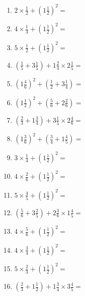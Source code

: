 \documentclass[12pt]{article}
\begin{document}
\begin{enumerate}
\item \large $ 2 \times \frac{1}{2} + (1 \frac{1}{2})^2 = $ \vspace{1.8cm}
\item \large $ 4 \times \frac{1}{3} + (1 \frac{1}{2})^2 = $ \vspace{1.8cm}
\item \large $ 5 \times \frac{1}{2} + (1 \frac{1}{2})^2 = $ \vspace{1.8cm}
\item \large $ (\frac{1}{5} + 3 \frac{1}{5}) + 1 \frac{2}{4} \times 2 \frac{1}{5} = $ \vspace{1.8cm}
\item \large $ (1 \frac{4}{6})^2 + (\frac{1}{2} + 3 \frac{1}{4}) = $ \vspace{1.8cm}
\item \large $ (1 \frac{1}{2})^2 + (\frac{5}{6} + 2 \frac{2}{6}) = $ \vspace{1.8cm}
\item \large $ (\frac{2}{3} + 1 \frac{3}{4}) + 3 \frac{1}{5} \times 2 \frac{4}{6} = $ \vspace{1.8cm}
\item \large $ (1 \frac{3}{6})^2 + (\frac{3}{4} + 1 \frac{4}{5}) = $ \vspace{1.8cm}
\item \large $ 3 \times \frac{1}{4} + (1 \frac{1}{2})^2 = $ \vspace{1.8cm}
\item \large $ 4 \times \frac{2}{6} + (1 \frac{1}{2})^2 = $ \vspace{1.8cm}
\newpage
\item \large $ 5 \times \frac{4}{5} + (1 \frac{1}{2})^2 = $ \vspace{1.8cm}
\item \large $ (\frac{5}{6} + 3 \frac{2}{5}) + 2 \frac{3}{6} \times 1 \frac{4}{5} = $ \vspace{1.8cm}
\item \large $ 4 \times \frac{5}{6} + (1 \frac{1}{2})^2 = $ \vspace{1.8cm}
\item \large $ 4 \times \frac{3}{4} + (1 \frac{1}{2})^2 = $ \vspace{1.8cm}
\item \large $ 5 \times \frac{2}{3} + (1 \frac{1}{2})^2 = $ \vspace{1.8cm}
\item \large $ (\frac{2}{3} + 1 \frac{1}{2}) + 1 \frac{3}{4} \times 3 \frac{4}{5} = $ \vspace{1.8cm}

\end{enumerate}
\end{document}
